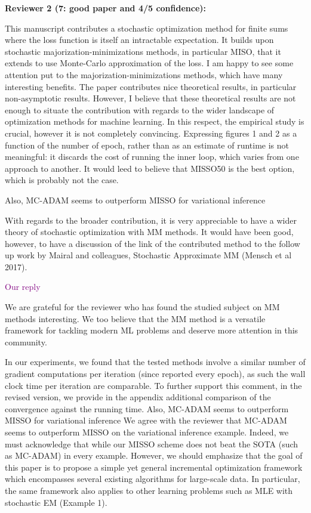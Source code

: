 \documentclass{article} %
\theoremstyle{t}
\begin{document}
\textbf{Reviewer 2 (7: good paper and 4/5 confidence):}

This manuscript contributes a stochastic optimization method for finite sums where the loss function is itself an intractable expectation. It builds upon stochastic majorization-minimizations methods, in particular MISO, that it extends to use Monte-Carlo approximation of the loss.
I am happy to see some attention put to the majorization-minimizations methods, which have many interesting benefits. The paper contributes nice theoretical results, in particular non-asymptotic results. However, I believe that these theoretical results are not enough to situate the contribution with regards to the wider landscape of optimization methods for machine learning.
In this respect, the empirical study is crucial, however it is not completely convincing. Expressing figures 1 and 2 as a function of the number of epoch, rather than as an estimate of runtime is not meaningful: it discards the cost of running the inner loop, which varies from one approach to another. It would leed to believe that MISSO50 is the best option, which is probably not the case.

Also, MC-ADAM seems to outperform MISSO for variational inference

With regards to the broader contribution, it is very appreciable to have a wider theory of stochastic optimization with MM methods. It would have been good, however, to have a discussion of the link of the contributed method to the follow up work by Mairal and colleagues, Stochastic Approximate MM (Mensch et al 2017).

\textcolor{purple}{Our reply}

We are grateful for the reviewer who has found the studied subject on MM methods interesting. We too believe that the MM method is a versatile framework for tackling modern ML problems and deserve more attention in this community.

In our experiments, we found that the tested methods involve a similar number of gradient computations per iteration (since reported every epoch), as such the wall clock time per iteration are comparable. To further support this comment, in the revised version, we provide in the appendix additional comparison of the convergence against the running time. 
Also, MC-ADAM seems to outperform MISSO for variational inference
We agree with the reviewer that MC-ADAM seems to outperform MISSO on the variational inference example. Indeed, we must acknowledge that while our MISSO scheme does not beat the SOTA (such as MC-ADAM) in every example. However, we should emphasize that the goal of this paper is to propose a simple yet general incremental optimization framework which encompasses several existing algorithms for large-scale data. In particular, the same framework also applies to other learning problems such as MLE with stochastic EM (Example 1). 
\end{document}

